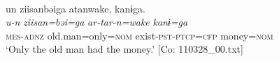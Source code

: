 \ex{}\\
{\US}
\gll un  ziisanbəiga  atanwake,     kanɨga.\\
      \textit{u-n}  \textit{ziisan=bəi=ga}  \textit{ar-tar-n=wake}      \textit{kanɨ=ga}\\
      \textsc{mes}-\textsc{adnz}  old.man=only=\textsc{nom}  exist-\textsc{pst}-\textsc{ptcp}=\textsc{cfp}    money=\textsc{nom}\\
\glt ‘Only the old man had the money.’ [Co: 110328\_00.txt]
\z
\z

